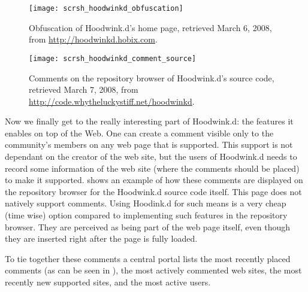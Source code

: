 \begin{figure}
  \centering
  \texttt{[image: scrsh\_hoodwinkd\_obfuscation]}
  \caption[Hoodwink.d Obfuscation]{
    Obfuscation of Hoodwink.d's home page,
    retrieved March 6, 2008, from
    \url{http://hoodwinkd.hobix.com}.
  }
  \label{figure:scrsh.hoodwinkd.obfuscation}
\end{figure}

\begin{figure}
  \begin{whole}
    \centering
    \texttt{[image: scrsh\_hoodwinkd\_comment\_source]}
    \caption[Hoodwink.d Comments]{
      Comments on the repository browser of Hoodwink.d's source code,
      retrieved March 7, 2008, from
      \url{http://code.whytheluckystiff.net/hoodwinkd}.
    }
    \label{figure:scrsh.hoodwinkd.comment.source}
  \end{whole}
\end{figure}

Now we finally get to the really interesting part of Hoodwink.d: the features
it enables on top of the Web. One can create a comment visible only to the
community's members on any web page that is supported. This support is not
dependant on the creator of the web site, but the users of Hoodwink.d needs to
record some information of the web site (where the comments should be placed)
to make it supported.  shows an
example of how these comments are displayed on the repository browser for
the Hoodwink.d source code itself. This page does not natively support
comments. Using Hoodink.d for such means is a very cheap (time wise) option
compared to implementing such features in the repository browser.
They are perceived as being part of the web page itself, even though they
are inserted right after the page is fully loaded.

To tie together these comments a central portal lists
the most recently placed comments (as can be seen in
), the most actively commented web
sites, the most recently new supported sites, and the most active users.



